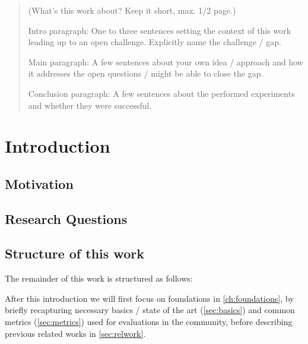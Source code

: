 \documentclass[%
  a4paper,fontsize=11pt,abstract=on,%
  twoside,BCOR=19mm,%
]{scrreprt}
\begin{document}



\begin{abstract}
(What's this work about? Keep it short, max. 1/2 page.)

Intro paragraph:
One to three sentences setting the context of this work leading up to an open challenge.
Explicitly name the challenge / gap.

Main paragraph:
A few sentences about your own idea / approach and how it addresses the open questions / might be able to close the gap.

Conclusion paragraph:
A few sentences about the performed experiments and whether they were successful.
\end{abstract}

\cleardoublepage
\tableofcontents

\cleardoublepage
\setcounter{page}{1}



\chapter{Introduction}\label{ch:intro}
\section{Motivation}
\lipsum[1-3]

\section{Research Questions}\label{sec:researchQuestions}
\lipsum[1-3]


\section{Structure of this work}\label{sec:structure}
The remainder of this work is structured as follows:

After this introduction we will first focus on foundations in \autoref{ch:foundations}, by briefly recapturing necessary basics / state of the art (\autoref{sec:basics}) and common metrics (\autoref{sec:metrics}) used for evaluations in the community, before describing previous related works in \autoref{sec:relwork}.
\end{document}
